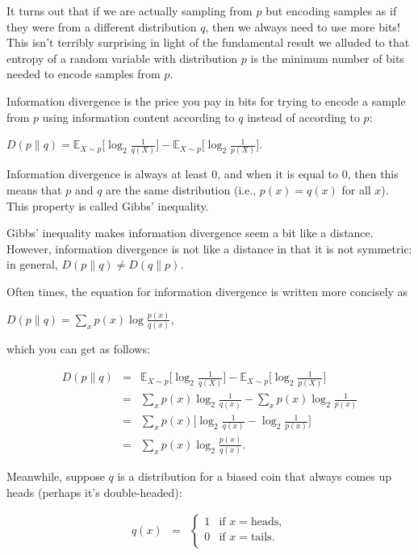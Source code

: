 \documentclass[6008notes.tex]{subfiles}
\begin{document}
It turns out that if we are actually sampling from $p$ but encoding samples as if they were from a different distribution $q$, then we always need to use more bits! This isn't terribly surprising in light of the fundamental result we alluded to that entropy of a random variable with distribution $p$ is the minimum number of bits needed to encode samples from $p$.

Information divergence is the price you pay in bits for trying to encode a sample from $p$ using information content according to $q$ instead of according to $p$:

{\centering$D(p\parallel q)=\mathbb {E}_{X \sim p}\Big[\log _{2}\frac{1}{q(X)}\Big]-\mathbb {E}_{X \sim p}\Big[\log _{2}\frac{1}{p(X)}\Big].$ \par}
 
Information divergence is always at least 0, and when it is equal to 0, then this means that $p$ and $q$ are the same distribution (i.e., $p(x)=q(x)$ for all $x$). This property is called Gibbs' inequality.

Gibbs' inequality makes information divergence seem a bit like a distance. However, information divergence is not like a distance in that it is not symmetric: in general, $D(p \parallel q) \ne D(q \parallel p)$.

Often times, the equation for information divergence is written more concisely as

{\centering$D(p\parallel q) = \sum _ x p(x) \log \frac{p(x)}{q(x)},$ \par}
 
which you can get as follows:

\begin{eqnarray*}
D(p\parallel q)
&=&
  \mathbb{E}_{X \sim p}\Big[\log_{2}\frac{1}{q(X)}\Big]
- \mathbb{E}_{X \sim p}\Big[\log_{2}\frac{1}{p(X)}\Big] \\
&=&
  \sum_x p(x) \log_2 \frac{1}{q(x)}
- \sum_x p(x) \log_2 \frac{1}{p(x)} \\
&=&
  \sum_x p(x)
  \Big[ \log_2 \frac{1}{q(x)} - \log_2 \frac{1}{p(x)} \Big] \\
&=&
  \sum_x p(x)
  \log_2 \frac{p(x)}{q(x)}.
\end{eqnarray*}

Meanwhile, suppose $q$ is a distribution for a biased coin that always comes up heads (perhaps it's double-headed):

\begin{eqnarray*}
q(x)
&=&
\begin{cases}
1 & \text{if }x=\text{heads}, \\
0 & \text{if }x=\text{tails}. \\
\end{cases}
\end{eqnarray*}
\end{document}

